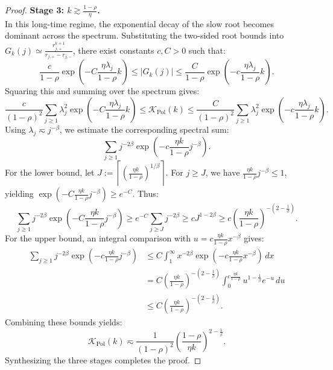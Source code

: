 \begin{proof}
\textbf{Stage 3: $k \gtrsim \frac{1-\rho}{\eta}$.} \\
In this long-time regime, the exponential decay of the slow root becomes dominant across the spectrum. Substituting the two-sided root bounds into $G_k(j) \simeq \frac{r_{j,+}^{k+1}}{r_{j,+}-r_{j,-}}$, there exist constants $c, C > 0$ such that:
\begin{equation*}
    \frac{c}{1-\rho}
    \exp\left(-C\frac{\eta\lambda_j}{1-\rho}k\right)
    \le
    |G_k(j)|
    \le
    \frac{C}{1-\rho}
    \exp\left(-c\frac{\eta\lambda_j}{1-\rho}k\right).
\end{equation*}
Squaring this and summing over the spectrum gives:
\begin{equation*}
    \frac{c}{(1-\rho)^2}
    \sum_{j\ge1}\lambda_j^2
    \exp\left(-C\frac{\eta\lambda_j}{1-\rho}k\right)
    \le
    \mathcal K_{\mathrm{Pol}}(k)
    \le
    \frac{C}{(1-\rho)^2}
    \sum_{j\ge1}\lambda_j^2
    \exp\left(-c\frac{\eta\lambda_j}{1-\rho}k\right).
\end{equation*}
Using $\lambda_j \eqsim j^{-\beta}$, we estimate the corresponding spectral sum:
\[
    \sum_{j\ge1}j^{-2\beta}
    \exp\left(-c\frac{\eta k}{1-\rho}j^{-\beta}\right).
\]
For the lower bound, let $J:=\left\lceil \left(\frac{\eta k}{1-\rho}\right)^{1/\beta}\right\rceil$. For $j\ge J$, we have $\frac{\eta k}{1-\rho}j^{-\beta}\le1$, yielding $\exp\left(-C\frac{\eta k}{1-\rho}j^{-\beta}\right)\ge e^{-C}$. Thus:
\[
    \sum_{j\ge1}j^{-2\beta}
    \exp\left(-C\frac{\eta k}{1-\rho}j^{-\beta}\right)
    \ge
    e^{-C}\sum_{j\ge J}j^{-2\beta}
    \ge
    c J^{1-2\beta}
    \ge
    c\left(\frac{\eta k}{1-\rho}\right)^{-\left(2-\frac1\beta\right)}.
\]
For the upper bound, an integral comparison with $u=c\frac{\eta k}{1-\rho}x^{-\beta}$ gives:
\begin{align*}
    \sum_{j\ge1}j^{-2\beta}
    \exp\left(-c\frac{\eta k}{1-\rho}j^{-\beta}\right)
    &\le
    C\int_1^\infty x^{-2\beta}
    \exp\left(-c\frac{\eta k}{1-\rho}x^{-\beta}\right)\,dx \\
    &=
    C\left(\frac{\eta k}{1-\rho}\right)^{-\left(2-\frac1\beta\right)}
    \int_0^{c\frac{\eta k}{1-\rho}}u^{1-\frac1\beta}e^{-u}\,du \\
    &\le
    C\left(\frac{\eta k}{1-\rho}\right)^{-\left(2-\frac1\beta\right)}.
\end{align*}
Combining these bounds yields:
\[
    \mathcal K_{\mathrm{Pol}}(k)
    \eqsim
    \frac{1}{(1-\rho)^2}
    \left(\frac{1-\rho}{\eta k}\right)^{2-\frac1\beta}.
\]
Synthesizing the three stages completes the proof.
\end{proof}

